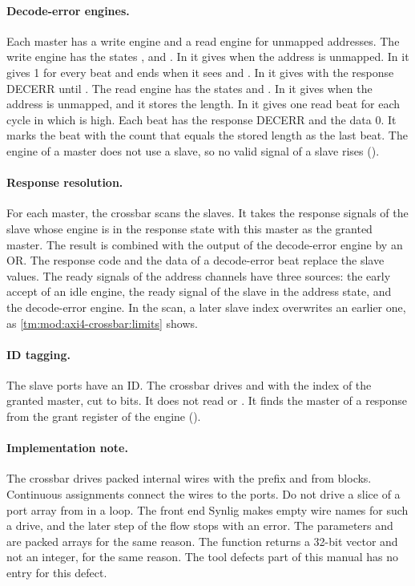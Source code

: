\paragraph{Decode-error engines.} Each master has a write engine and a read engine for unmapped addresses. The write engine has the states ,  and . In  it gives  when the address is unmapped. In  it gives  1 for every beat and ends when it sees  and . In  it gives  with the response DECERR until . The read engine has the states  and . In  it gives  when the address is unmapped, and it stores the length. In  it gives one read beat for each cycle in which  is high. Each beat has the response DECERR and the data 0. It marks the beat with the count that equals the stored length as the last beat. The engine of a master does not use a slave, so no valid signal of a slave rises ().

\paragraph{Response resolution.} For each master, the crossbar scans the slaves. It takes the response signals of the slave whose engine is in the response state with this master as the granted master. The result is combined with the output of the decode-error engine by an OR. The response code and the data of a decode-error beat replace the slave values. The ready signals of the address channels have three sources: the early accept of an idle engine, the ready signal of the slave in the address state, and the decode-error engine. In the scan, a later slave index overwrites an earlier one, as \cref{tm:mod:axi4-crossbar:limits} shows.

\paragraph{ID tagging.} The slave ports have an ID. The crossbar drives  and  with the index of the granted master, cut to  bits. It does not read  or . It finds the master of a response from the grant register of the engine ().

\paragraph{Implementation note.} The crossbar drives packed internal wires with the prefix  and  from  blocks. Continuous assignments connect the wires to the ports. Do not drive a slice of a port array from  in a loop. The front end Synlig makes empty wire names for such a drive, and the later step of the flow stops with an error. The parameters  and  are packed arrays for the same reason. The function  returns a 32-bit vector and not an integer, for the same reason. The tool defects part of this manual has no entry for this defect.

